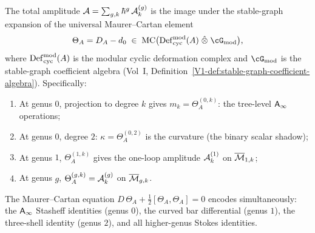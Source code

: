 \begin{theorem}[BV amplitudes $=$ MC projections;
\ClaimStatusProvedHere]
\label{thm:thqg-bv-ext-mc-projections}
The total amplitude
$\mathcal{A} = \sum_{g,k} \hbar^g\,\mathcal{A}_k^{(g)}$
is the image under the stable-graph expansion of the universal
Maurer--Cartan element
\[
\Theta_A = D_A - d_0
\;\in\; \mathrm{MC}\bigl(\Def_{\mathrm{cyc}}^{\mathrm{mod}}(A)
\;\hat\otimes\; \cG_{\mathrm{mod}}\bigr),
\]
where $\operatorname{Def}_{\mathrm{cyc}}^{\mathrm{mod}}(A)$ is the modular
cyclic deformation complex and $\cG_{\mathrm{mod}}$ is the
stable-graph coefficient algebra (Vol~I,
Definition~\ref{V1-def:stable-graph-coefficient-algebra}).
Specifically:
\begin{enumerate}[label=(\roman*)]
\item At genus $0$, projection to degree $k$ gives
 $m_k = \Theta_A^{(0,k)}$: the tree-level $\mathsf{A}_{\infty}$ operations;
\item At genus $0$, degree $2$: $\kappa = \Theta_A^{(0,2)}$ is
 the curvature (the binary scalar shadow);
\item At genus $1$, $\Theta_A^{(1,k)}$ gives the one-loop
 amplitude $\mathcal{A}_k^{(1)}$ on $\overline{\mathcal{M}}_{1,k}$;
\item At genus $g$, $\Theta_A^{(g,k)} = \mathcal{A}_k^{(g)}$ on
 $\overline{\mathcal{M}}_{g,k}$.
\end{enumerate}
The Maurer--Cartan equation
$D\,\Theta_A + \tfrac{1}{2}[\Theta_A, \Theta_A] = 0$
encodes simultaneously: the $\mathsf{A}_{\infty}$ Stasheff identities (genus $0$),
the curved bar differential (genus $1$), the three-shell identity
(genus $2$), and all higher-genus Stokes identities.
\end{theorem}

